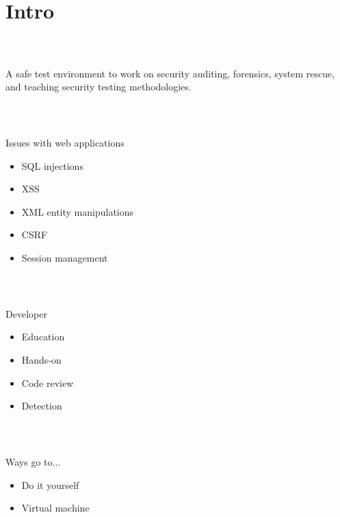 \section{Intro}
%
\begin{frame}
\frametitle{\\}
A safe test environment to work on security auditing, forensics, system rescue, and teaching security testing methodologies.
\end{frame}
%
\begin{frame}
\frametitle{\\}
%
{\LARGE Issues with web applications\newline}
\begin{itemize}
  \item SQL injections
  \item XSS
  \item XML entity manipulations
  \item CSRF
  \item Session management
\end{itemize}
\end{frame}
%
\begin{frame}
\frametitle{\\}
%
{\LARGE Developer \newline}
\begin{itemize}
  \item Education
  \item Hands-on
  \item Code review
  \item Detection
\end{itemize}
\end{frame}
%
\begin{frame}
\frametitle{\\}
%
{\LARGE Ways go to... \newline}
\begin{itemize}
  \item Do it yourself
  \item Virtual machine
\end{itemize}
\end{frame}
